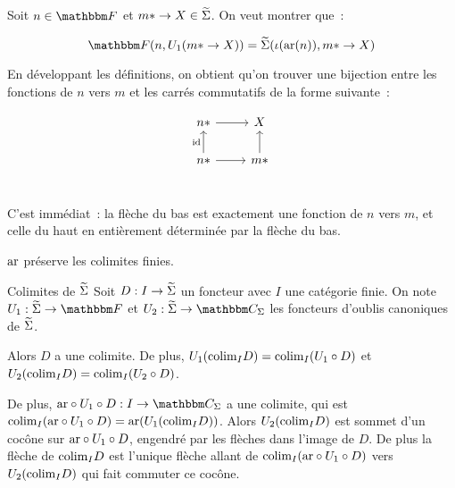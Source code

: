 \begin{pv}
    Soit $n\in\cf$ et $m\ast\rightarrow X\in\widetilde{\Sigma}$. On veut montrer que~:

    \[\cf(n, U_1(m\ast\rightarrow X)) = \tsigma(\iota(\arf(n)), m\ast\rightarrow X)\]

    En développant les définitions, on obtient qu'on trouver une bijection entre
    les fonctions de $n$ vers $m$ et les carrés commutatifs de la forme suivante~:

    \[\begin{tikzcd}
        n\ast\arrow[r] & X \\
        n\ast\arrow[u, "\id"]\arrow[r] & m\ast\arrow[u] \\
    \end{tikzcd}\]

    C'est immédiat~: la flèche du bas est exactement une fonction de $n$ vers $m$,
    et celle du haut en entièrement déterminée par la flèche du bas.
\end{pv}

\begin{cor}\label{arfExact}
    $\text{ar}$ préserve les colimites finies.
\end{cor}

\begin{theo}{Colimites de $\widetilde{\Sigma}$}\label{commaCL}
    Soit $D : I\rightarrow\widetilde{\Sigma}$ un foncteur avec $I$ une catégorie finie. On note
    $U_1 : \tsigma\rightarrow\cf$ et $U_2 : \tsigma\rightarrow\C_\Sigma$ les foncteurs
    d'oublis canoniques de $\widetilde{\Sigma}$.

    Alors $D$ a une colimite. De plus, $U_1(\text{colim}_I D) = \text{colim}_I (U_1\circ D)$ et
    $U_2(\text{colim}_I D) = \text{colim}_I (U_2\circ D)$.

    De plus, $\arf\circ U_1\circ D : I\rightarrow\C_\Sigma$ a une colimite, qui
    est $\text{colim}_I (\text{ar}\circ U_1\circ D) = \text{ar}(U_1(\text{colim}_I D))$. Alors
    $U_2(\text{colim}_I D)$ est sommet d'un cocône sur $\text{ar}\circ U_1\circ D$, engendré
    par les flèches dans l'image de $D$. De plus la flèche de $\text{colim}_I D$ est
    l'unique flèche allant de $\text{colim}_I (\text{ar}\circ U_1\circ D)$ vers $U_2(\text{colim}_I D)$
    qui fait commuter ce cocône.
\end{theo}

